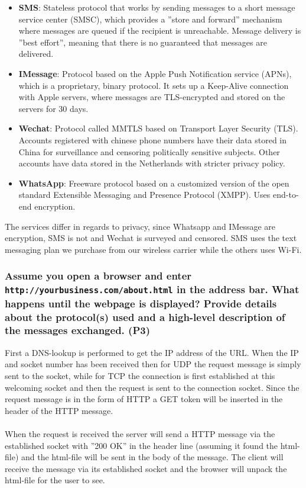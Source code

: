 \begin{itemize}
    \item \textbf{SMS}: Stateless protocol that works by sending messages to a short message service center (SMSC), which provides a ''store and forward'' mechanism where messages are queued if the recipient is unreachable. Message delivery is ''best effort'', meaning that there is no guaranteed that messages are delivered. 
    \item \textbf{IMessage}: Protocol based on the Apple Push Notification service (APNs), which is a proprietary, binary protocol. It sets up a Keep-Alive connection with Apple servers, where messages are TLS-encrypted and stored on the servers for 30 days.
    \item \textbf{Wechat}: Protocol called MMTLS based on Transport Layer Security (TLS). Accounts registered with chinese phone numbers have their data stored in China for surveillance and censoring politically sensitive subjects. Other accounts have data stored in the Netherlands with stricter privacy policy.
    \item \textbf{WhatsApp}: Freeware protocol based on a customized version of the open standard Extensible Messaging and Presence Protocol (XMPP). Uses end-to-end encryption.
\end{itemize}
The services differ in regards to privacy, since Whatsapp and IMessage are encryption, SMS is not and Wechat is surveyed and censored. SMS uses the text messaging plan we purchase from our wireless carrier while the others uses Wi-Fi.


\subsubsection{Assume you open a browser and enter \texttt{http://yourbusiness.com/about.html} in the address bar. What happens until the webpage is displayed? Provide details about the protocol(s) used and a high-level description of the messages exchanged. (P3)}

First a DNS-lookup is performed to get the IP address of the URL. When the IP and socket number has been received then for UDP the request message is simply sent to the socket, while for TCP the connection is first established at this welcoming socket and then the request is sent to the connection socket. Since the request message is in the form of HTTP a GET token will be inserted in the header of the HTTP message. \\
\\
When the request is received the server will send a HTTP message via the established socket with ''200 OK'' in the header line (assuming it found the html-file) and the html-file will be sent in the body of the message. The client will receive the message via its established socket and the browser will unpack the html-file for the user to see.


